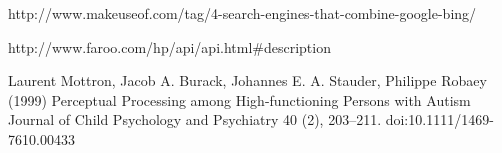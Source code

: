 \documentclass[10pt]{article}
\begin{document}
\begin{thebibliography}{100}
 http://www.makeuseof.com/tag/4-search-engines-that-combine-google-bing/


http://www.faroo.com/hp/api/api.html\#description

 Laurent Mottron, Jacob A. Burack, Johannes E. A. Stauder, Philippe Robaey (1999) Perceptual Processing among High-functioning Persons with Autism Journal of Child Psychology and Psychiatry 40 (2), 203–211. doi:10.1111/1469-7610.00433

\end{thebibliography}
\end{document}
